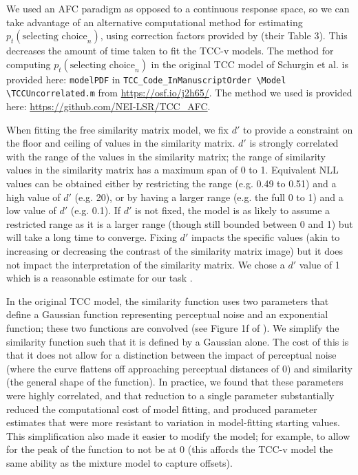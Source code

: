 We used an AFC paradigm as opposed to a continuous response space, so we can take advantage of an alternative computational method for estimating $p_t(\text{selecting choice}_n)$, using correction factors provided by \citet{mcgraw_common_1992} (their Table 3). 
This decreases the amount of time taken to fit the TCC-v models. 
The method for computing $p_t(\text{selecting choice}_n)$ in the original TCC model of Schurgin et al. is provided here: \verb|modelPDF| in \verb|TCC_Code_InManuscriptOrder |\verb|\Model| \verb|\TCCUncorrelated.m| from \url{https://osf.io/j2h65/}. 
The method we used is provided here: \url{https://github.com/NEI-LSR/TCC_AFC}.

When fitting the free similarity matrix model, we fix $d'$ to provide a constraint on the floor and ceiling of values in the similarity matrix.
$d'$ is strongly correlated with the range of the values in the similarity matrix; the range of similarity values in the similarity matrix has a maximum span of 0 to 1. 
Equivalent NLL values can be obtained either by restricting the range (e.g. 0.49 to 0.51) and a high value of $d'$ (e.g. 20), or by having a larger range (e.g. the full 0 to 1) and a low value of $d'$ (e.g. 0.1). 
If $d'$ is not fixed, the model is as likely to assume a restricted range as it is a larger range (though still bounded between 0 and 1) but will take a long time to converge. 
Fixing $d'$ impacts the specific values (akin to increasing or decreasing the contrast of the similarity matrix image) but it does not impact the interpretation of the similarity matrix. 
We chose a $d'$ value of 1 which is a reasonable estimate for our task \citep{schurgin_psychophysical_2020}.

In the original TCC model, the similarity function uses two parameters that define a Gaussian function representing perceptual noise and an exponential function; these two functions are convolved (see Figure 1f of \citep{schurgin_psychophysical_2020}). 
We simplify the similarity function such that it is defined by a Gaussian alone. 
The cost of this is that it does not allow for a distinction between the impact of perceptual noise (where the curve flattens off approaching perceptual distances of 0) and similarity (the general shape of the function). 
In practice, we found that these parameters were highly correlated, and that reduction to a single parameter substantially reduced the computational cost of model fitting, and produced parameter estimates that were more resistant to variation in model-fitting starting values. 
This simplification also made it easier to modify the model; for example, to allow for the peak of the function to not be at 0 (this affords the TCC-v model the same ability as the mixture model to capture offsets).

